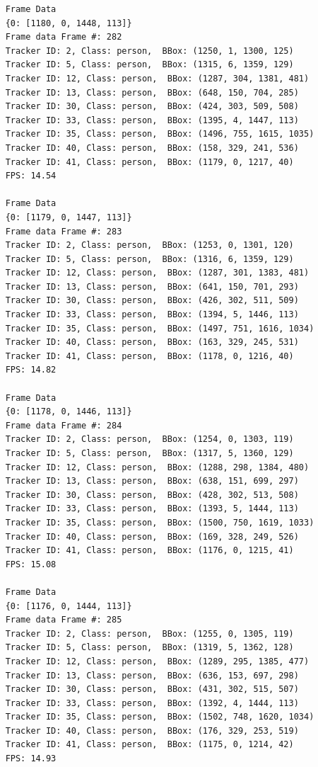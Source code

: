 \documentclass{fisatprojectfinal}
\begin{document}
\begin{verbatim}
    Frame Data
    {0: [1180, 0, 1448, 113]}
    Frame data Frame #: 282
    Tracker ID: 2, Class: person,  BBox: (1250, 1, 1300, 125)
    Tracker ID: 5, Class: person,  BBox: (1315, 6, 1359, 129)
    Tracker ID: 12, Class: person,  BBox: (1287, 304, 1381, 481)
    Tracker ID: 13, Class: person,  BBox: (648, 150, 704, 285)
    Tracker ID: 30, Class: person,  BBox: (424, 303, 509, 508)
    Tracker ID: 33, Class: person,  BBox: (1395, 4, 1447, 113)
    Tracker ID: 35, Class: person,  BBox: (1496, 755, 1615, 1035)
    Tracker ID: 40, Class: person,  BBox: (158, 329, 241, 536)
    Tracker ID: 41, Class: person,  BBox: (1179, 0, 1217, 40)
    FPS: 14.54
    
    Frame Data
    {0: [1179, 0, 1447, 113]}
    Frame data Frame #: 283
    Tracker ID: 2, Class: person,  BBox: (1253, 0, 1301, 120)
    Tracker ID: 5, Class: person,  BBox: (1316, 6, 1359, 129)
    Tracker ID: 12, Class: person,  BBox: (1287, 301, 1383, 481)
    Tracker ID: 13, Class: person,  BBox: (641, 150, 701, 293)
    Tracker ID: 30, Class: person,  BBox: (426, 302, 511, 509)
    Tracker ID: 33, Class: person,  BBox: (1394, 5, 1446, 113)
    Tracker ID: 35, Class: person,  BBox: (1497, 751, 1616, 1034)
    Tracker ID: 40, Class: person,  BBox: (163, 329, 245, 531)
    Tracker ID: 41, Class: person,  BBox: (1178, 0, 1216, 40)
    FPS: 14.82
    
    Frame Data
    {0: [1178, 0, 1446, 113]}
    Frame data Frame #: 284
    Tracker ID: 2, Class: person,  BBox: (1254, 0, 1303, 119)
    Tracker ID: 5, Class: person,  BBox: (1317, 5, 1360, 129)
    Tracker ID: 12, Class: person,  BBox: (1288, 298, 1384, 480)
    Tracker ID: 13, Class: person,  BBox: (638, 151, 699, 297)
    Tracker ID: 30, Class: person,  BBox: (428, 302, 513, 508)
    Tracker ID: 33, Class: person,  BBox: (1393, 5, 1444, 113)
    Tracker ID: 35, Class: person,  BBox: (1500, 750, 1619, 1033)
    Tracker ID: 40, Class: person,  BBox: (169, 328, 249, 526)
    Tracker ID: 41, Class: person,  BBox: (1176, 0, 1215, 41)
    FPS: 15.08
    
    Frame Data
    {0: [1176, 0, 1444, 113]}
    Frame data Frame #: 285
    Tracker ID: 2, Class: person,  BBox: (1255, 0, 1305, 119)
    Tracker ID: 5, Class: person,  BBox: (1319, 5, 1362, 128)
    Tracker ID: 12, Class: person,  BBox: (1289, 295, 1385, 477)
    Tracker ID: 13, Class: person,  BBox: (636, 153, 697, 298)
    Tracker ID: 30, Class: person,  BBox: (431, 302, 515, 507)
    Tracker ID: 33, Class: person,  BBox: (1392, 4, 1444, 113)
    Tracker ID: 35, Class: person,  BBox: (1502, 748, 1620, 1034)
    Tracker ID: 40, Class: person,  BBox: (176, 329, 253, 519)
    Tracker ID: 41, Class: person,  BBox: (1175, 0, 1214, 42)
    FPS: 14.93
\end{verbatim}
\end{document}
